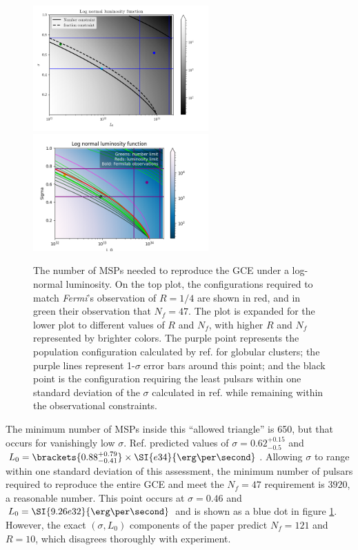 \documentclass{C://Aliases//Dropbox-MIT//Latex_Templates//personal}
\begin{document}
\begin{figure}[h]
    \centering
    \includegraphics[width=0.6\textwidth]{../../luminosity-models/log-normal/contour-overlay.png}
    \includegraphics[width=0.6\textwidth]{../../luminosity-models/log-normal/contour-overlay-extra.png}
    \caption{The number of MSPs needed to reproduce the GCE under a log-normal luminosity. On the top plot, the configurations required to match \textit{Fermi}'s observation of $R=1/4$ are shown in red, and in green their observation that $N_f = 47$. The plot is expanded for the lower plot to different values of $R$ and $N_f$, with higher $R$ and $N_f$ represented by brighter colors. The purple point represents the population configuration calculated by ref. \cite{log-normal} for globular clusters; the purple lines represent 1-$\sigma$ error bars around this point; and the black point is the configuration requiring the least pulsars within one standard deviation of the $\sigma$ calculated in ref. \cite{log-normal} while remaining within the observational constraints.}
    \label{contour-overlay-log-normal}
\end{figure}

The minimum number of MSPs inside this ``allowed triangle'' is 650, but that occurs for vanishingly low $\sigma$. Ref. \cite{log-normal} predicted values of $\sigma = 0.62^{+0.15}_{-0.5}$ and $L_0 = \brackets{0.88^{+0.79}_{-0.41}}\times\SI{e34}{\erg\per\second}$. Allowing $\sigma$ to range within one standard deviation of this assessment, the minimum number of pulsars required to reproduce the entire GCE and meet the $N_f=47$ requirement is $3920$, a reasonable number. This point occurs at $\sigma = 0.46$ and $L_0 = \SI{9.26e32}{\erg\per\second}$ and is shown as a blue dot in figure \ref{contour-overlay-log-normal}. However, the exact $(\sigma, L_0)$ components of the paper predict $N_f=121$ and $R=10$, which disagrees thoroughly with experiment.
\end{document}
